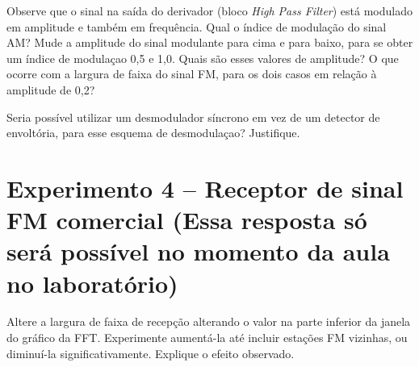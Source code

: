 \documentclass[12pt,addpoints]{exam}
\begin{document}
\begin{questions}
    \question Observe que o sinal na saída do derivador (bloco {\em High Pass Filter}) está modulado em amplitude e também em frequência. Qual o índice de modulação do sinal AM? Mude a amplitude do sinal modulante para cima e para baixo, para se obter um índice de modulaçao 0,5 e 1,0. Quais são esses valores de amplitude? O que ocorre com a largura de faixa do sinal FM, para os dois casos em relação à amplitude de 0,2?
    \fillwithlines{1in}

    \question Seria possível utilizar um desmodulador síncrono em vez de um detector de envoltória, para esse esquema de desmodulaçao? Justifique.
    \fillwithlines{1in}

\end{questions}

\section*{Experimento 4 -- Receptor de sinal FM comercial (Essa resposta só será possível no momento da aula no laboratório)}

\begin{questions}
    \question Altere a largura de faixa de recepção alterando o valor na parte inferior da janela do gráfico da FFT. Experimente aumentá-la até incluir estações FM vizinhas, ou diminuí-la significativamente. Explique o efeito observado.
    \fillwithlines{1in}
    
\end{questions}
\end{document}
